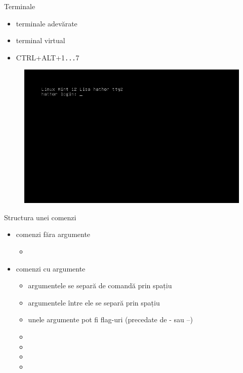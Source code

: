 \documentclass{curs}
\begin{document}
\begin{frame}{Terminale}
  \begin{itemize}
    \item terminale adevărate
    \item terminal virtual
    \item CTRL+ALT+1\texttt{...}7
  \end{itemize}
  \begin{figure}
    \includegraphics[width=0.7\linewidth,hight=0.7\linehight]{img/tty}
  \end{figure}
\end{frame}

\begin{frame}{Structura unei comenzi}
  \begin{itemize}
    \item comenzi făra argumente
    \begin{itemize}
      \item {}
    \end{itemize}
    \item comenzi cu argumente
    \begin{itemize}
      \item argumentele se separă de comandă prin spațiu
      \item argumentele între ele se separă prin spațiu
      \item unele argumente pot fi flag-uri (precedate de - sau --)
      \item {}
      \item {}
      \item {}
      \item {}
    \end{itemize}
  \end{itemize}
\end{frame}
\end{document}
